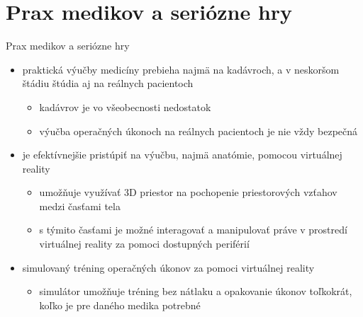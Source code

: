 \documentclass[10pt]{beamer}
\begin{document}
\section{Prax medikov a seriózne hry}
    \begin{frame}{Prax medikov a seriózne hry}
  \begin{itemize}
  \setlength\itemsep{2em}
\item praktická výučby medicíny prebieha najmä na kadávroch, a v neskoršom štádiu štúdia aj na reálnych pacientoch
	\begin{itemize}
	\item kadávrov je vo všeobecnosti nedostatok
	\item výučba operačných úkonoch na reálnych pacientoch je nie vždy bezpečná
	\end{itemize}
	
\item je efektívnejšie pristúpiť na výučbu, najmä anatómie, pomocou virtuálnej reality
	\begin{itemize}
	\item umožňuje využívať 3D priestor na pochopenie priestorových vzťahov medzi časťami tela
	\item s týmito časťami je možné interagovať a manipulovať práve v prostredí virtuálnej reality za pomoci dostupných periférií
	\end{itemize}
	
\item simulovaný tréning operačných úkonov za pomoci virtuálnej reality
	\begin{itemize}
	\item simulátor umožňuje tréning bez nátlaku a opakovanie úkonov toľkokrát, koľko je pre daného medika potrebné

	\end{itemize}
\end{itemize}
    \end{frame}
\end{document}
